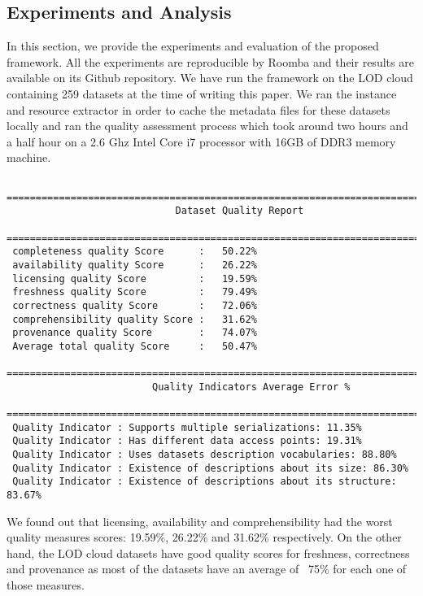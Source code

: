 \subsection{Experiments and Analysis}
In this section, we provide the experiments and evaluation of the proposed framework. All the experiments are reproducible by Roomba and their results are available on its Github repository. We have run the framework on the LOD cloud containing 259 datasets at the time of writing this paper. We ran the instance and resource extractor in order to cache the metadata files for these datasets locally and ran the quality assessment process which took around two hours and a half hour on a 2.6 Ghz Intel Core i7 processor with 16GB of DDR3 memory machine.

\begin{lstlisting}
 =================================================================================
                             Dataset Quality Report
 =================================================================================
 completeness quality Score      :   50.22%
 availability quality Score      :   26.22%
 licensing quality Score         :   19.59%
 freshness quality Score         :   79.49%
 correctness quality Score       :   72.06%
 comprehensibility quality Score :   31.62%
 provenance quality Score        :   74.07%
 Average total quality Score     :   50.47%
 =================================================================================
                         Quality Indicators Average Error %
 =================================================================================
 Quality Indicator : Supports multiple serializations: 11.35%
 Quality Indicator : Has different data access points: 19.31%
 Quality Indicator : Uses datasets description vocabularies: 88.80%
 Quality Indicator : Existence of descriptions about its size: 86.30%
 Quality Indicator : Existence of descriptions about its structure: 83.67%
\end{lstlisting}

We found out that licensing, availability and comprehensibility had the worst quality measures scores: 19.59\%, 26.22\% and 31.62\% respectively. On the other hand, the LOD cloud datasets have good quality scores for freshness, correctness and provenance as most of the datasets have an average of ~75\% for each one of those measures.

